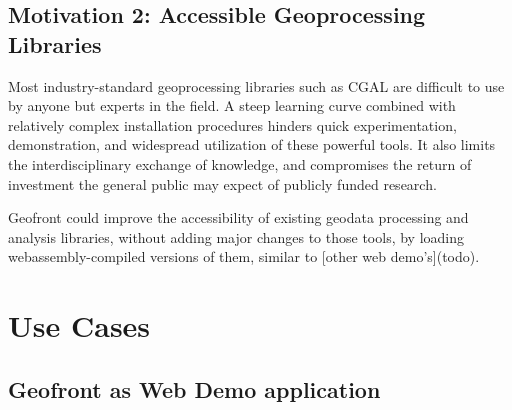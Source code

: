 \subsection{Motivation 2: Accessible Geoprocessing Libraries}

Most industry-standard geoprocessing libraries such as CGAL are difficult to use by anyone but experts in the field. A steep learning curve combined with relatively complex installation procedures hinders quick experimentation, demonstration, and widespread utilization of these powerful tools. It also limits the interdisciplinary exchange of knowledge, and compromises the return of investment the general public may expect of publicly funded research.

Geofront could improve the accessibility of existing geodata processing and analysis libraries, without adding major changes to those tools, by loading webassembly-compiled versions of them, similar to [other web demo's](todo).











\section{Use Cases}






\subsection{Geofront as Web Demo application}




